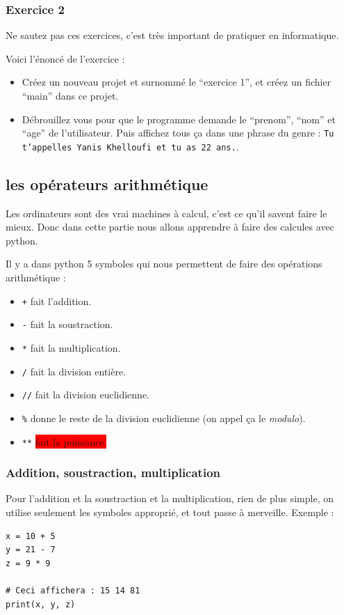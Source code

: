 \documentclass[12pt]{article}
\newcommand{\code}[1]{\colorbox{light-gray}{\texttt{#1}}}
\begin{document}
        \subsubsection{Exercice 2}
            Ne sautez pas ces exercices, c'est très important de pratiquer en informatique.

            Voici l'énoncé de l'exercice :
            \begin{itemize}
                \item Créez un nouveau projet et surnommé le ``exercice 1'', et créez un fichier ``main'' dans ce
                    projet.
                \item Débrouillez vous pour que le programme demande le ``prenom'', ``nom'' et ``age'' de l'utilisateur.
                    Puis affichez tous ça dans une phrase du genre : \code{Tu t'appelles Yanis Khelloufi et tu as 22 ans.}.
            \end{itemize}


\clearpage

    \subsection{les opérateurs arithmétique}
        Les ordinateurs sont des vrai machines à calcul, c'est ce qu'il savent faire le mieux. Donc dans cette partie
        nous allons apprendre à faire des calcules avec python.

        Il y a dans python 5 symboles qui nous permettent de faire des opérations arithmétique :
        \begin{itemize}
            \item \code{+} fait l'addition.
            \item \code{-} fait la soustraction.
            \item \code{*} fait la multiplication.
            \item \code{/} fait la division entière.
            \item \code{//} fait la division euclidienne.
            \item \code{\%} donne le reste de la division euclidienne (on appel ça le \emph{modulo}).
            \item \code{**} \colorbox{red}{fait la puissance.}
        \end{itemize}

        \subsubsection{Addition, soustraction, multiplication}
            Pour l'addition et la soustraction et la multiplication, rien de plus simple, on utilise seulement 
            les symboles approprié, et tout passe à merveille. Exemple :
            \begin{lstlisting}[style=code]
x = 10 + 5
y = 21 - 7
z = 9 * 9

# Ceci affichera : 15 14 81
print(x, y, z) 
            \end{lstlisting}
\end{document}
